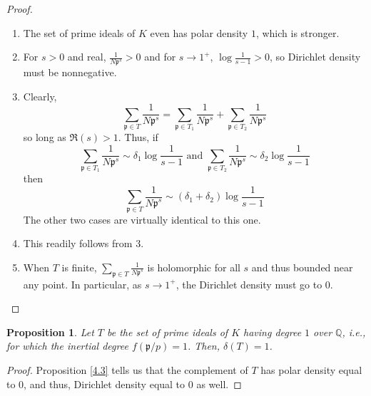 \documentclass{article}
\newcommand{\QQ}{\mathbb{Q}}
\theoremstyle{plain}
\newtheorem{prop}[thm]{Proposition}
\theoremstyle{definition}
\theoremstyle{remark}
\numberwithin{equation}{section}
\numberwithin{thm}{section}
\begin{document}
\begin{proof}

$ $ \\ \vspace{-0.1cm}

\begin{enumerate}

\item The set of prime ideals of $K$ even has polar density $1$, which is stronger. 

\item For $s > 0$ and real, $\frac{1}{N\mathfrak{p}^{s}} > 0$ and for $s \to 1^{+}$, $\log\frac{1}{s - 1} > 0$, so Dirichlet density must be nonnegative. 

\item Clearly, $$\sum_{\mathfrak{p} \in T} \frac{1}{N\mathfrak{p}^{s}} = \sum_{\mathfrak{p} \in T_1} \frac{1}{N\mathfrak{p}^{s}} + \sum_{\mathfrak{p} \in T_2} \frac{1}{N\mathfrak{p}^{s}}$$ so long as $\Re(s) > 1$. Thus, if $$\sum_{\mathfrak{p} \in T_1} \frac{1}{N\mathfrak{p}^{s}} \sim \delta_{1}\log\frac{1}{s - 1} \text{ and } \sum_{\mathfrak{p} \in T_2} \frac{1}{N\mathfrak{p}^{s}} \sim \delta_{2}\log\frac{1}{s - 1}$$ then $$\sum_{\mathfrak{p} \in T} \frac{1}{N\mathfrak{p}^{s}} \sim (\delta_{1} + \delta_{2})\log\frac{1}{s - 1}$$ The other two cases are virtually identical to this one.

\item This readily follows from 3. 

\item When $T$ is finite, $\sum_{\mathfrak{p} \in T} \frac{1}{N\mathfrak{p}^{s}}$ is holomorphic for all $s$ and thus bounded near any point. In particular, as $s \to 1^{+}$, the Dirichlet density must go to $0$. 

\end{enumerate}

\end{proof}

\begin{prop}
Let $T$ be the set of prime ideals of $K$ having degree $1$ over $\QQ$, i.e., for which the inertial degree $f(\mathfrak{p} / p) = 1$. Then, $\delta(T) = 1$. 
\end{prop}

\begin{proof}
Proposition \ref{4.3} tells us that the complement of $T$ has polar density equal to $0$, and thus, Dirichlet density equal to $0$ as well. 
\end{proof}
\end{document}
